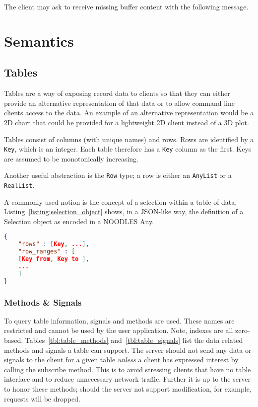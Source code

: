 \documentclass[11pt, oneside]{amsart}
\begin{document}
The client may ask to receive missing buffer content with the following message.




\section{Semantics}


\subsection{Tables}

Tables are a way of exposing record data to clients so that they can either provide an alternative representation of that data or to allow command line clients access to the data. An example of an alternative representation would be a 2D chart that could be provided for a lightweight 2D client instead of a 3D plot.

Tables consist of columns (with unique names) and rows. Rows are identified by a \texttt{Key}, which is an integer. Each table therefore has a \texttt{Key} column as the first. Keys are assumed to be monotonically increasing.

Another useful abstraction is the \texttt{Row} type; a row is either an \texttt{AnyList} or a \texttt{RealList}.

A commonly used notion is the concept of a selection within a table of data. Listing~\ref{listing:selection_object} shows, in a JSON-like way, the definition of a Selection object as encoded in a NOODLES Any.

\begin{lstlisting}[language=json, label=listing:selection_object, caption=Selection object definition. Note that the \texttt{to} field in the row ranges is exclusive. ]
{ 
	"rows" : [Key, ...], 
	"row_ranges" : [ 
	[Key from, Key to ],
	...
	]
}
\end{lstlisting}

\subsubsection{Methods \& Signals}

To query table information, signals and methods are used. These names are restricted and cannot be used by the user application. Note, indexes are all zero-based. Tables~\ref{tbl:table_methods} and~\ref{tbl:table_signals} list the data related methods and signals a table can support. The server should not send any data or signals to the client for a given table \emph{unless} a client has expressed interest by calling the subscribe method. This is to avoid stressing clients that have no table interface and to reduce unnecessary network traffic. Further it is up to the server to honor these methods; should the server not support modification, for example, requests will be dropped.
\end{document}
